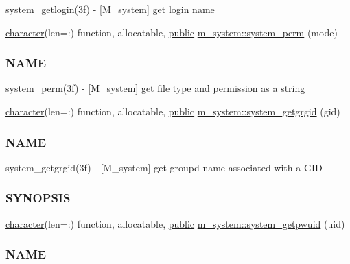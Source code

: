 \begin{DoxyCompactItemize}
\begin{DoxyCompactList}
system\+\_\+getlogin(3f) -\/ \mbox{[}M\+\_\+system\mbox{]} get login name \end{DoxyCompactList}\item 
\hyperlink{option__stopwatch_83_8txt_abd4b21fbbd175834027b5224bfe97e66}{character}(len=\+:) function, allocatable, \hyperlink{M__stopwatch_83_8txt_a2f74811300c361e53b430611a7d1769f}{public} \hyperlink{namespacem__system_ae8f39e1d4e420396319105e4e81f92b5}{m\+\_\+system\+::system\+\_\+perm} (mode)
\begin{DoxyCompactList}\small\item\em \subsubsection*{N\+A\+ME}

system\+\_\+perm(3f) -\/ \mbox{[}M\+\_\+system\mbox{]} get file type and permission as a string \end{DoxyCompactList}\item 
\hyperlink{option__stopwatch_83_8txt_abd4b21fbbd175834027b5224bfe97e66}{character}(len=\+:) function, allocatable, \hyperlink{M__stopwatch_83_8txt_a2f74811300c361e53b430611a7d1769f}{public} \hyperlink{namespacem__system_aec137429fbb8c848db4ecd914466d7e8}{m\+\_\+system\+::system\+\_\+getgrgid} (gid)
\begin{DoxyCompactList}\small\item\em \subsubsection*{N\+A\+ME}

system\+\_\+getgrgid(3f) -\/ \mbox{[}M\+\_\+system\mbox{]} get groupd name associated with a G\+ID \subsubsection*{S\+Y\+N\+O\+P\+S\+IS}\end{DoxyCompactList}\item 
\hyperlink{option__stopwatch_83_8txt_abd4b21fbbd175834027b5224bfe97e66}{character}(len=\+:) function, allocatable, \hyperlink{M__stopwatch_83_8txt_a2f74811300c361e53b430611a7d1769f}{public} \hyperlink{namespacem__system_a59cd13de95dc9a65b444f02614ea39ce}{m\+\_\+system\+::system\+\_\+getpwuid} (uid)
\begin{DoxyCompactList}\small\item\em \subsubsection*{N\+A\+ME}


\end{DoxyCompactList}
\end{DoxyCompactItemize}
